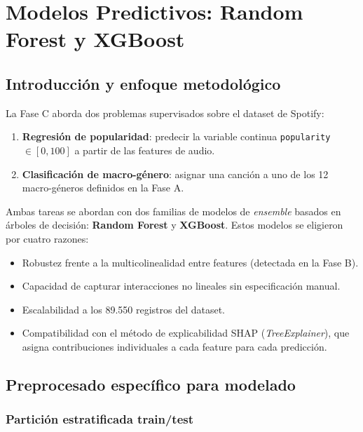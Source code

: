 \documentclass[12pt, a4paper, twoside]{book}
\theoremstyle{definition}
\begin{document}
\chapter{Modelos Predictivos: Random Forest y XGBoost}
\label{ch:modelos}

\section{Introducción y enfoque metodológico}

La Fase C aborda dos problemas supervisados sobre el dataset de Spotify:

\begin{enumerate}
  \item \textbf{Regresión de popularidad}: predecir la variable continua
        \texttt{popularity} $\in [0, 100]$ a partir de las features de audio.
  \item \textbf{Clasificación de macro-género}: asignar una canción a uno de los
        12 macro-géneros definidos en la Fase A.
\end{enumerate}

Ambas tareas se abordan con dos familias de modelos de \textit{ensemble} basados
en árboles de decisión: \textbf{Random Forest} y \textbf{XGBoost}. Estos modelos
se eligieron por cuatro razones:

\begin{itemize}
  \item Robustez frente a la multicolinealidad entre features (detectada en la Fase B).
  \item Capacidad de capturar interacciones no lineales sin especificación manual.
  \item Escalabilidad a los 89.550 registros del dataset.
  \item Compatibilidad con el método de explicabilidad SHAP (\textit{TreeExplainer}),
        que asigna contribuciones individuales a cada feature para cada predicción.
\end{itemize}

\section{Preprocesado específico para modelado}

\subsection{Partición estratificada train/test}
\end{document}

